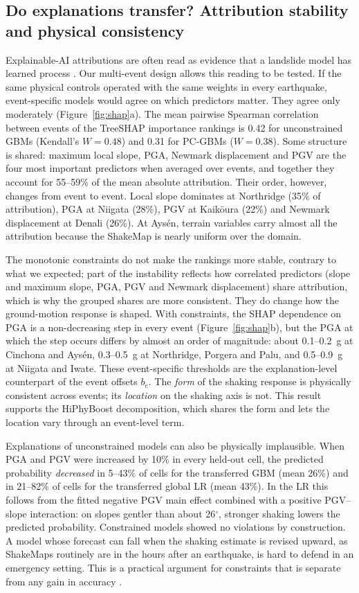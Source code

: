 \subsection{Do explanations transfer? Attribution stability and physical consistency}
Explainable-AI attributions are often read as evidence that a landslide model has learned process \citep{dahal2023xai}. Our multi-event design allows this reading to be tested. If the same physical controls operated with the same weights in every earthquake, event-specific models would agree on which predictors matter. They agree only moderately (Figure~\ref{fig:shap}a). The mean pairwise Spearman correlation between events of the TreeSHAP importance rankings is 0.42 for unconstrained GBMs (Kendall's $W=0.48$) and 0.31 for PC-GBMs ($W=0.38$). Some structure is shared: maximum local slope, PGA, Newmark displacement and PGV are the four most important predictors when averaged over events, and together they account for 55--59\% of the mean absolute attribution. Their order, however, changes from event to event. Local slope dominates at Northridge (35\% of attribution), PGA at Niigata (28\%), PGV at Kaik\={o}ura (22\%) and Newmark displacement at Denali (26\%). At Ays\'en, terrain variables carry almost all the attribution because the ShakeMap is nearly uniform over the domain.

The monotonic constraints do not make the rankings more stable, contrary to what we expected; part of the instability reflects how correlated predictors (slope and maximum slope, PGA, PGV and Newmark displacement) share attribution, which is why the grouped shares are more consistent. They do change how the ground-motion response is shaped. With constraints, the SHAP dependence on PGA is a non-decreasing step in every event (Figure~\ref{fig:shap}b), but the PGA at which the step occurs differs by almost an order of magnitude: about 0.1--0.2~g at Cinchona and Ays\'en, 0.3--0.5~g at Northridge, Porgera and Palu, and 0.5--0.9~g at Niigata and Iwate. These event-specific thresholds are the explanation-level counterpart of the event offsets $b_e$. The \emph{form} of the shaking response is physically consistent across events; its \emph{location} on the shaking axis is not. This result supports the HiPhyBoost decomposition, which shares the form and lets the location vary through an event-level term.

Explanations of unconstrained models can also be physically implausible. When PGA and PGV were increased by 10\% in every held-out cell, the predicted probability \emph{decreased} in 5--43\% of cells for the transferred GBM (mean 26\%) and in 21--82\% of cells for the transferred global LR (mean 43\%). In the LR this follows from the fitted negative PGV main effect combined with a positive PGV--slope interaction: on slopes gentler than about 26$^\circ$, stronger shaking lowers the predicted probability. Constrained models showed no violations by construction. A model whose forecast can fall when the shaking estimate is revised upward, as ShakeMaps routinely are in the hours after an earthquake, is hard to defend in an emergency setting. This is a practical argument for constraints that is separate from any gain in accuracy \citep{rudin2019}.
